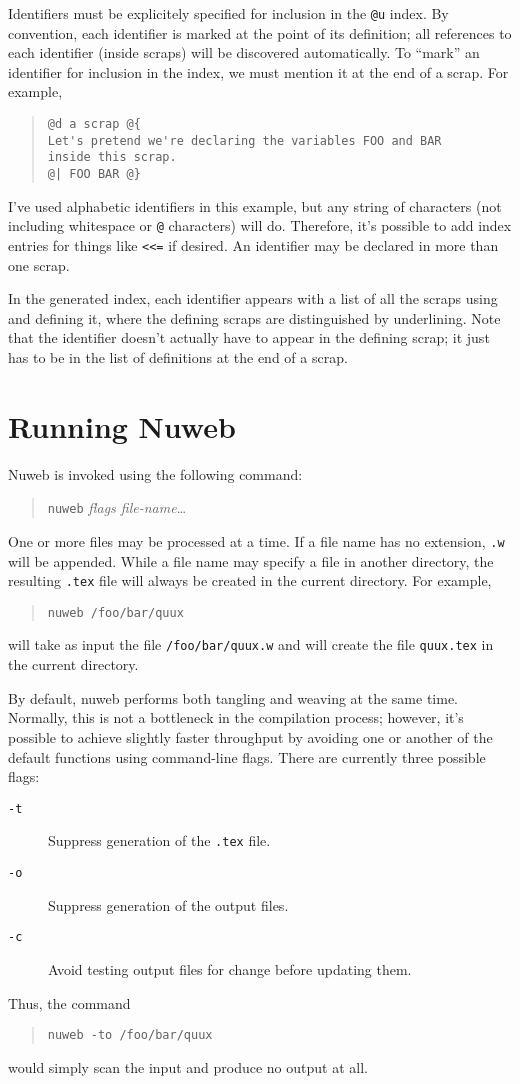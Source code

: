 Identifiers must be explicitely specified for inclusion in the
\verb|@u| index. By convention, each identifier is marked at the
point of its definition; all references to each identifier (inside
scraps) will be discovered automatically. To ``mark'' an identifier
for inclusion in the index, we must mention it at the end of a scrap.
For example,
\begin{quote}
\begin{verbatim}
@d a scrap @{
Let's pretend we're declaring the variables FOO and BAR
inside this scrap.
@| FOO BAR @}
\end{verbatim}
\end{quote}
I've used alphabetic identifiers in this example, but any string of
characters (not including whitespace or \verb|@| characters) will do.
Therefore, it's possible to add index entries for things like
\verb|<<=| if desired. An identifier may be declared in more than one
scrap.

In the generated index, each identifier appears with a list of all the
scraps using and defining it, where the defining scraps are
distinguished by underlining. Note that the identifier doesn't
actually have to appear in the defining scrap; it just has to be in
the list of definitions at the end of a scrap.


\section{Running Nuweb}

Nuweb is invoked using the following command:
\begin{quote}
{\tt nuweb} {\em flags file-name}\ldots
\end{quote}
One or more files may be processed at a time. If a file name has no
extension, \verb|.w| will be appended. While a file name may specify a
file in another directory, the resulting \verb|.tex| file will always
be created in the current directory. For example,
\begin{quote}
{\tt nuweb /foo/bar/quux}
\end{quote}
will take as input the file \verb|/foo/bar/quux.w| and will create the
file \verb|quux.tex| in the current directory.

By default, nuweb performs both tangling and weaving at the same time.
Normally, this is not a bottleneck in the compilation process;
however, it's possible to achieve slightly faster throughput by
avoiding one or another of the default functions using command-line
flags. There are currently three possible flags:
\begin{description}
\item[\tt -t] Suppress generation of the \verb|.tex| file.
\item[\tt -o] Suppress generation of the output files.
\item[\tt -c] Avoid testing output files for change before updating them.
\end{description}
Thus, the command
\begin{quote}
\verb|nuweb -to /foo/bar/quux|
\end{quote}
would simply scan the input and produce no output at all.

